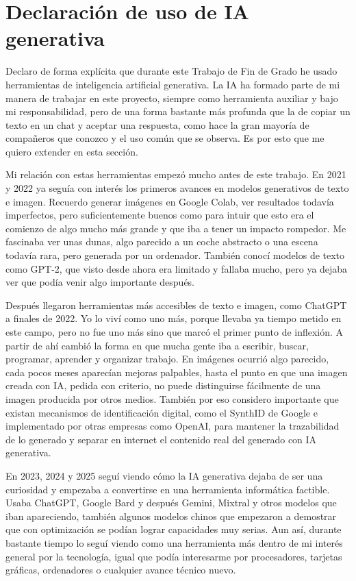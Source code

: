 \clearpage
{}
\section*{Declaración de uso de IA generativa}

Declaro de forma explícita que durante este Trabajo de Fin de Grado he usado
herramientas de inteligencia artificial generativa. La IA ha formado parte de mi manera
de trabajar en este proyecto, siempre como herramienta auxiliar y bajo mi
responsabilidad, pero de una forma bastante más profunda que la de copiar un texto en
un chat y aceptar una respuesta, como hace la gran mayoría de compañeros que conozco y
el uso común que se observa. Es por esto que me quiero extender en esta sección.

Mi relación con estas herramientas empezó mucho antes de este trabajo. En 2021 y 2022
ya seguía con interés los primeros avances en modelos generativos de texto e
imagen. Recuerdo generar imágenes en Google Colab, ver resultados todavía
imperfectos, pero suficientemente buenos como para intuir que esto era el comienzo
de algo mucho más grande y que iba a tener un impacto rompedor. Me fascinaba ver
unas dunas, algo parecido a un coche abstracto o una escena todavía rara, pero
generada por un ordenador. También conocí modelos de texto como GPT-2, que visto
desde ahora era limitado y fallaba mucho, pero ya dejaba ver que podía venir
algo importante después.

Después llegaron herramientas más accesibles de texto e imagen, como ChatGPT a
finales de 2022. Yo lo viví como uno más, porque llevaba ya tiempo metido en este
campo, pero no fue uno más sino que marcó el primer punto de inflexión. A
partir de ahí cambió la forma en que mucha gente iba a escribir, buscar,
programar, aprender y organizar trabajo. En imágenes ocurrió algo parecido, cada
pocos meses aparecían mejoras palpables, hasta el punto en que una imagen creada con
IA, pedida con criterio, no puede distinguirse fácilmente de una imagen producida por
otros medios. También por eso considero importante que existan mecanismos de
identificación digital, como el SynthID de Google e implementado por otras empresas como
OpenAI, para mantener la trazabilidad de lo generado y separar en internet el contenido
real del generado con IA generativa.

En 2023, 2024 y 2025 seguí viendo cómo la IA generativa dejaba de ser una
curiosidad y empezaba a convertirse en una herramienta informática factible. Usaba
ChatGPT, Google Bard y después Gemini, Mixtral y otros modelos que iban
apareciendo, también algunos modelos chinos que empezaron a demostrar que con
optimización se podían lograr capacidades muy serias. Aun así, durante bastante
tiempo lo seguí viendo como una herramienta más dentro de mi interés general por
la tecnología, igual que podía interesarme por procesadores, tarjetas gráficas,
ordenadores o cualquier avance técnico nuevo.

